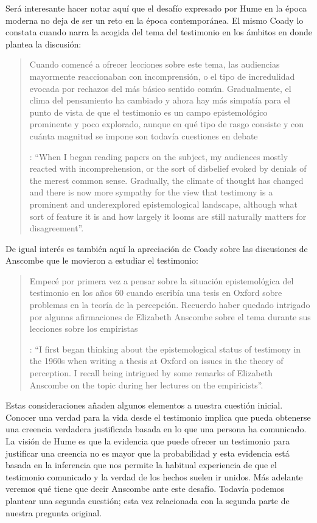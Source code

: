 Será interesante hacer notar aquí que el desafío expresado por Hume en la época moderna no deja de ser un reto en la época contemporánea. El mismo Coady lo constata cuando narra la acogida del tema del testimonio en los ámbitos en donde plantea la discusión: \blockquote[{\Cite[vii]{coady1992test}}: \enquote{When I began reading papers on the subject, my audiences mostly reacted with incomprehension, or the sort of disbelief evoked by denials of the merest common sense. Gradually, the climate of thought has changed and there is now more sympathy for the view that testimony is a prominent and underexplored epistemological landscape, although what sort of feature it is and how largely it looms are still naturally matters for disagreement}.]{Cuando comencé a ofrecer lecciones sobre este tema, las audiencias mayormente reaccionaban con incomprensión, o el tipo de incredulidad evocada por rechazos del más básico sentido común. Gradualmente, el clima del pensamiento ha cambiado y ahora hay más simpatía para el punto de vista de que el testimonio es un campo epistemológico prominente y poco explorado, aunque en qué tipo de rasgo consiste y con cuánta magnitud se impone son todavía cuestiones en debate}. De igual interés es también aquí la apreciación de Coady sobre las discusiones de Anscombe que le movieron a estudiar el testimonio: \blockquote[{\Cite[vii]{coady1992test}}: \enquote{I first began thinking about the epistemological status of testimony in the 1960s when writing a thesis at Oxford on issues in the theory of perception. \textelp{} I recall being intrigued by some remarks of Elizabeth Anscombe on the topic during her lectures on the empiricists}.]{Empecé por primera vez a pensar sobre la situación epistemológica del testimonio en los años 60 cuando escribía una tesis en Oxford sobre problemas en la teoría de la percepción. \textelp{} Recuerdo haber quedado intrigado por algunas afirmaciones de Elizabeth Anscombe sobre el tema durante sus lecciones sobre los empiristas}

Estas consideraciones añaden algunos elementos a nuestra cuestión inicial. Conocer una verdad para la vida desde el testimonio implica que pueda obtenerse una creencia verdadera justificada basada en lo que una persona ha comunicado. La visión de Hume es que la evidencia que puede ofrecer un testimonio para justificar una creencia no es mayor que la probabilidad y esta evidencia está basada en la inferencia que nos permite la habitual experiencia de que el testimonio comunicado y la verdad de los hechos suelen ir unidos. Más adelante veremos qué tiene que decir Anscombe ante este desafío. Todavía podemos plantear una segunda cuestión; esta vez relacionada con la segunda parte de nuestra pregunta original.

